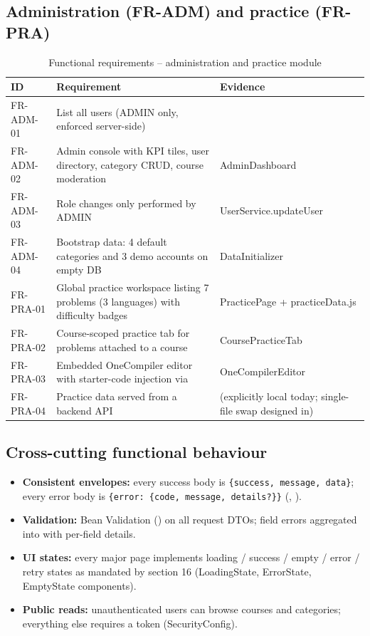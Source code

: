 \subsection{Administration (FR-ADM) and practice (FR-PRA)}
\begin{table}[H]
\centering
\caption{Functional requirements -- administration and practice module}
\label{tab:fr-admin}
\begin{tabular}{@{}C{1.5cm}L{8.6cm}L{3.9cm}@{}}
\toprule
\textbf{ID} & \textbf{Requirement} & \textbf{Evidence} \\
\midrule
FR-ADM-01 & List all users (ADMIN only, enforced server-side) &   \\
FR-ADM-02 & Admin console with KPI tiles, user directory, category CRUD, course moderation & AdminDashboard \\
FR-ADM-03 & Role changes only performed by ADMIN & UserService.updateUser \\
FR-ADM-04 & Bootstrap data: 4 default categories and 3 demo accounts on empty DB & DataInitializer \\
FR-PRA-01 & Global practice workspace listing 7 problems (3 languages) with difficulty badges & PracticePage + practiceData.js \\
FR-PRA-02 & Course-scoped practice tab for problems attached to a course & CoursePracticeTab \\
FR-PRA-03 & Embedded OneCompiler editor with starter-code injection via  & OneCompilerEditor \\
FR-PRA-04 & Practice data served from a backend API &  (explicitly local today; single-file swap designed in) \\
\bottomrule
\end{tabular}
\end{table}

\subsection{Cross-cutting functional behaviour}
\begin{itemize}
    \item \textbf{Consistent envelopes:} every success body is \texttt{\{success, message, data\}}; every error body is \texttt{\{error: \{code, message, details?\}\}} (, ).
    \item \textbf{Validation:} Bean Validation () on all request DTOs; field errors aggregated into  with per-field details.
    \item \textbf{UI states:} every major page implements loading / success / empty / error / retry states as mandated by  section 16 (LoadingState, ErrorState, EmptyState components).
    \item \textbf{Public reads:} unauthenticated users can browse courses and categories; everything else requires a token (SecurityConfig).
\end{itemize}
